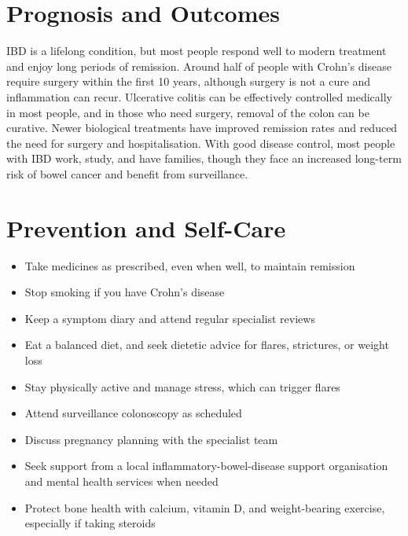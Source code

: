 \section*{Prognosis and Outcomes}
IBD is a lifelong condition, but most people respond well to modern treatment and enjoy long periods of remission. Around half of people with Crohn's disease require surgery within the first 10 years, although surgery is not a cure and inflammation can recur. Ulcerative colitis can be effectively controlled medically in most people, and in those who need surgery, removal of the colon can be curative. Newer biological treatments have improved remission rates and reduced the need for surgery and hospitalisation. With good disease control, most people with IBD work, study, and have families, though they face an increased long-term risk of bowel cancer and benefit from surveillance.

\section*{Prevention and Self-Care}
\begin{itemize}
    \item Take medicines as prescribed, even when well, to maintain remission
    \item Stop smoking if you have Crohn's disease
    \item Keep a symptom diary and attend regular specialist reviews
    \item Eat a balanced diet, and seek dietetic advice for flares, strictures, or weight loss
    \item Stay physically active and manage stress, which can trigger flares
    \item Attend surveillance colonoscopy as scheduled
    \item Discuss pregnancy planning with the specialist team
    \item Seek support from a local inflammatory-bowel-disease support organisation and mental health services when needed
    \item Protect bone health with calcium, vitamin D, and weight-bearing exercise, especially if taking steroids
\end{itemize}

